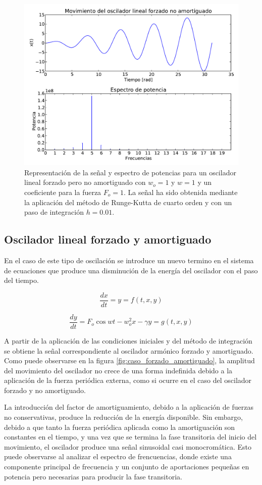 \documentclass[11pt]{article}
\begin{document}
\begin{figure}[h]
\centering
\includegraphics[width=0.75\linewidth]{caso_forzado.pdf}
\caption{Representación de la señal y espectro de potencias para un oscilador lineal forzado pero no amortiguado con $w_o = 1$ y $w = 1$ y un coeficiente para la fuerza $F_o = 1$. La señal ha sido obtenida mediante la aplicación del método de Runge-Kutta de cuarto orden y con un paso de integración $h = 0.01$.}
\label{fig:caso_forzado}
\end{figure}

\subsection{Oscilador lineal forzado y amortiguado}
En el caso de este tipo de oscilación se introduce un nuevo termino en el sistema de ecuaciones que produce una disminución de la energía del oscilador con el paso del tiempo.

\begin{equation}
	\frac{dx}{dt} = y = f(t, x, y)
\end{equation}

\begin{equation}
	\frac{dy}{dt} = F_o\cos{wt} - w_o^2 x - \gamma{}y = g(t, x, y) 	
\end{equation}

A partir de la aplicación de las condiciones iniciales y del método de integración se obtiene la señal correspondiente al oscilador armónico forzado y amortiguado. Como puede observarse en la figura \ref{fig:caso_forzado_amortiguado}, la amplitud del movimiento del oscilador no crece de una forma indefinida debido a la aplicación de la fuerza periódica externa, como si ocurre en el caso del oscilador forzado y no amortiguado.

La introducción del factor de amortiguamiento, debido a la aplicación de fuerzas no conservativas, produce la reducción de la energía disponible. Sin embargo, debido a que tanto la fuerza periódica aplicada como la amortiguación son constantes en el tiempo, y una vez que se termina la fase transitoria del inicio del movimiento, el oscilador produce una señal sinusoidal casi monocromática. Esto puede observarse al analizar el espectro de frencuencias, donde existe una componente principal de frecuencia y un conjunto de aportaciones pequeñas en potencia pero necesarias para producir la fase transitoria.  
\end{document}
